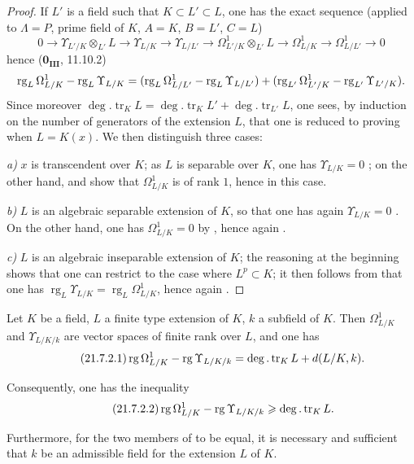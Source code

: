 \begin{proof}
If $L'$ is a field such that $K\subset L'\subset L$, one has the exact sequence  (applied to $\Lambda=P$, prime field of $K$, $A=K$, $B=L'$, $C=L$)
\[
  0\to\Upsilon_{L'/K}\otimes_{L'} L\to\Upsilon_{L/K}\to\Upsilon_{L/L'}\to\Omega^1_{L'/K}\otimes_{L'} L\to\Omega^1_{L/K}\to\Omega^1_{L/L'}\to 0
\]
hence ($\mathbf{0_{III}}$, 11.10.2)
\[
  \operatorname{rg}_L\Omega^1_{L/K}-\operatorname{rg}_L\Upsilon_{L/K}=(\operatorname{rg}_L\Omega^1_{L/L'}-\operatorname{rg}_L\Upsilon_{L/L'})+(\operatorname{rg}_{L'}\Omega^1_{L'/K}-\operatorname{rg}_{L'}\Upsilon_{L'/K}).
\]
Since moreover $\deg.\operatorname{tr}_K L=\deg.\operatorname{tr}_K L'+\deg.\operatorname{tr}_{L'} L$, one sees, by induction on the number of generators of the extension $L$, that one is reduced to proving  when $L=K(x)$.
We then distinguish three cases:

\emph{a)} $x$ is transcendent over $K$; as $L$ is separable over $K$, one has $\Upsilon_{L/K}=0$ ; on the other hand,  and  show that $\Omega^1_{L/K}$ is of rank $1$, hence  in this case.

\emph{b)} $L$ is an algebraic separable extension of $K$, so that one has again $\Upsilon_{L/K}=0$ .
On the other hand, one has $\Omega^1_{L/K}=0$ by , hence again .

\emph{c)} $L$ is an algebraic inseparable extension of $K$; the reasoning at the beginning shows that one can restrict to the case where $L^p\subset K$; it then follows from  that one has $\operatorname{rg}_L\Upsilon_{L/K}=\operatorname{rg}_L\Omega^1_{L/K}$, hence again .
\end{proof}

\begin{corollary}[21.7.2]
\label{0.21.7.2}
Let $K$ be a field, $L$ a finite type extension of $K$, $k$ a subfield of $K$.
Then $\Omega^1_{L/K}$ and $\Upsilon_{L/K/k}$ are vector spaces of finite rank over $L$, and one has
\begin{equation}
\tag{21.7.2.1}
  \label{0.21.7.2.1}
  \operatorname{rg}\Omega^1_{L/K}-\operatorname{rg}\Upsilon_{L/K/k}=\deg.\operatorname{tr}_K L+d(L/K,k).
\end{equation}

Consequently, one has the inequality
\begin{equation}
\tag{21.7.2.2}
  \label{0.21.7.2.2}
  \operatorname{rg}\Omega^1_{L/K}-\operatorname{rg}\Upsilon_{L/K/k}\geqslant\deg.\operatorname{tr}_K L.
\end{equation}

Furthermore, for the two members of  to be equal, it is necessary and sufficient that $k$ be an admissible field for the extension $L$ of $K$.
\end{corollary}

